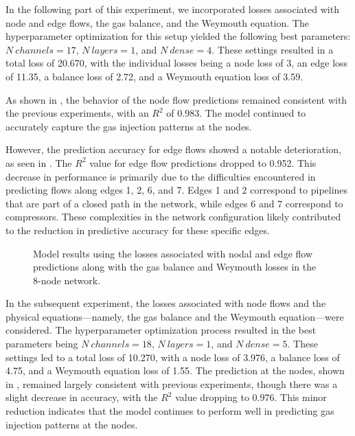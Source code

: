 In the following part of this experiment, we incorporated losses associated with node and edge flows, the gas balance, and the Weymouth equation. The hyperparameter optimization for this setup yielded the following best parameters: $N \ channels=17$, $N \ layers =1$, and $N \ dense =4$. These settings resulted in a total loss of 20.670, with the individual losses being a node loss of 3, an edge loss of 11.35, a balance loss of 2.72, and a Weymouth equation loss of 3.59.

As shown in , the behavior of the node flow predictions remained consistent with the previous experiments, with an $R^2$ of 0.983. The model continued to accurately capture the gas injection patterns at the nodes.

However, the prediction accuracy for edge flows showed a notable deterioration, as seen in . The $R^2$ value for edge flow predictions dropped to 0.952. This decrease in performance is primarily due to the difficulties encountered in predicting flows along edges 1, 2, 6, and 7. Edges 1 and 2 correspond to pipelines that are part of a closed path in the network, while edges 6 and 7 correspond to compressors. These complexities in the network configuration likely contributed to the reduction in predictive accuracy for these specific edges.

\begin{figure}[h]
    \centering
    \setlength{}        
    \setlength{} 
    
    \caption{Model results using the losses associated with nodal and edge flow predictions along with the gas balance and Weymouth losses in the 8-node network.}
    \label{fig:dummy_base_results}
\end{figure}

In the subsequent experiment, the losses associated with node flows and the physical equations—namely, the gas balance and the Weymouth equation—were considered. The hyperparameter optimization process resulted in the best parameters being $N \ channels=18$, $N \ layers=1$, and $N \ dense=5$. These settings led to a total loss of 10.270, with a node loss of 3.976, a balance loss of 4.75, and a Weymouth equation loss of 1.55. The prediction at the nodes, shown in , remained largely consistent with previous experiments, though there was a slight decrease in accuracy, with the $R^2$ value dropping to 0.976. This minor reduction indicates that the model continues to perform well in predicting gas injection patterns at the nodes.

